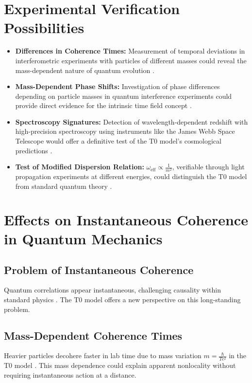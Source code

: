 \documentclass[12pt,a4paper]{article}
\begin{document}
	\section{Experimental Verification Possibilities}
	\begin{itemize}
		\item \textbf{Differences in Coherence Times:} Measurement of temporal deviations in interferometric experiments with particles of different masses could reveal the mass-dependent nature of quantum evolution \cite{pascher_erweiterung_2025}.
		
		\item \textbf{Mass-Dependent Phase Shifts:} Investigation of phase differences depending on particle masses in quantum interference experiments could provide direct evidence for the intrinsic time field concept \cite{pascher_feldtheorie_2025}.
		
		\item \textbf{Spectroscopy Signatures:} Detection of wavelength-dependent redshift with high-precision spectroscopy using instruments like the James Webb Space Telescope would offer a definitive test of the T0 model's cosmological predictions \cite{pascher_messdifferenzen_2025}.
		
		\item \textbf{Test of Modified Dispersion Relation:} \( \omega_{\text{eff}} \propto \frac{1}{m^2} \), verifiable through light propagation experiments at different energies, could distinguish the T0 model from standard quantum theory \cite{pascher_photons_2025}.
	\end{itemize}
	
	\section{Effects on Instantaneous Coherence in Quantum Mechanics}
	\subsection{Problem of Instantaneous Coherence}
	Quantum correlations appear instantaneous, challenging causality within standard physics \cite{bell}. The T0 model offers a new perspective on this long-standing problem.
	
	\subsection{Mass-Dependent Coherence Times}
	Heavier particles decohere faster in lab time due to mass variation \( m = \frac{\hbar}{T c^2} \) in the T0 model \cite{pascher_galaxies_2025, pascher_feldtheorie_2025}. This mass dependence could explain apparent nonlocality without requiring instantaneous action at a distance.
	
\end{document}
